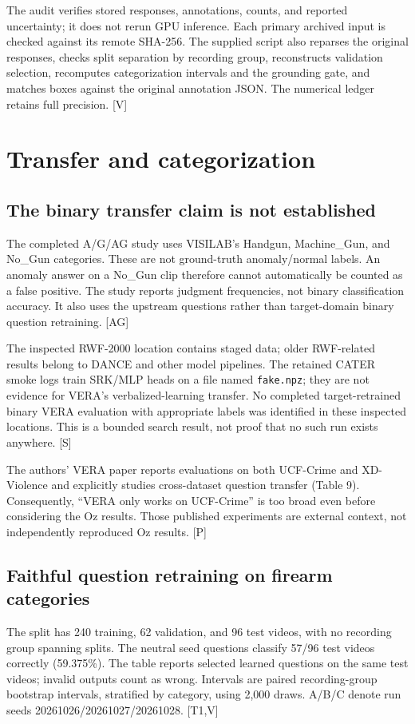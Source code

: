 \documentclass[11pt]{article}
\newcommand{\src}[1]{\textsf{[#1]}}
\begin{document}
The audit verifies stored responses, annotations, counts, and reported uncertainty; it does not rerun GPU inference. Each primary archived input is checked against its remote SHA-256. The supplied script also reparses the original responses, checks split separation by recording group, reconstructs validation selection, recomputes categorization intervals and the grounding gate, and matches boxes against the original annotation JSON. The numerical ledger retains full precision. \src{V}

\section{Transfer and categorization}
\subsection{The binary transfer claim is not established}
The completed A/G/AG study uses VISILAB's Handgun, Machine\_Gun, and No\_Gun categories. These are not ground-truth anomaly/normal labels. An anomaly answer on a No\_Gun clip therefore cannot automatically be counted as a false positive. The study reports judgment frequencies, not binary classification accuracy. It also uses the upstream questions rather than target-domain binary question retraining. \src{AG}

The inspected RWF-2000 location contains staged data; older RWF-related results belong to DANCE and other model pipelines. The retained CATER smoke logs train SRK/MLP heads on a file named \texttt{fake.npz}; they are not evidence for VERA's verbalized-learning transfer. No completed target-retrained binary VERA evaluation with appropriate labels was identified in these inspected locations. This is a bounded search result, not proof that no such run exists anywhere. \src{S}

The authors' VERA paper reports evaluations on both UCF-Crime and XD-Violence and explicitly studies cross-dataset question transfer (Table 9). Consequently, ``VERA only works on UCF-Crime'' is too broad even before considering the Oz results. Those published experiments are external context, not independently reproduced Oz results. \src{P}

\subsection{Faithful question retraining on firearm categories}
The split has 240 training, 62 validation, and 96 test videos, with no recording group spanning splits. The neutral seed questions classify 57/96 test videos correctly (59.375\%). The table reports selected learned questions on the same test videos; invalid outputs count as wrong. Intervals are paired recording-group bootstrap intervals, stratified by category, using 2,000 draws. A/B/C denote run seeds 20261026/20261027/20261028. \src{T1,V}
\end{document}
